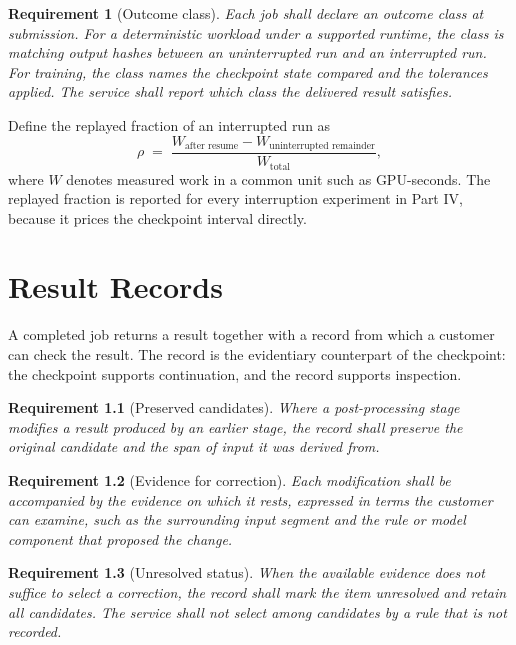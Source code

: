 \documentclass[11pt,openany]{book}
\newtheorem{requirement}{Requirement}[chapter]
\theoremstyle{remark}
\begin{document}
\begin{requirement}[Outcome class]
Each job shall declare an outcome class at submission. For a deterministic workload under a supported runtime, the class is matching output hashes between an uninterrupted run and an interrupted run. For training, the class names the checkpoint state compared and the tolerances applied. The service shall report which class the delivered result satisfies.
\end{requirement}

Define the replayed fraction of an interrupted run as
\[
\rho \;=\; \frac{W_{\text{after resume}} - W_{\text{uninterrupted remainder}}}{W_{\text{total}}},
\]
where $W$ denotes measured work in a common unit such as GPU-seconds. The replayed fraction is reported for every interruption experiment in Part IV, because it prices the checkpoint interval directly.

\chapter{Result Records}

A completed job returns a result together with a record from which a customer can check the result. The record is the evidentiary counterpart of the checkpoint: the checkpoint supports continuation, and the record supports inspection.

\begin{requirement}[Preserved candidates]
Where a post-processing stage modifies a result produced by an earlier stage, the record shall preserve the original candidate and the span of input it was derived from.
\end{requirement}

\begin{requirement}[Evidence for correction]
Each modification shall be accompanied by the evidence on which it rests, expressed in terms the customer can examine, such as the surrounding input segment and the rule or model component that proposed the change.
\end{requirement}

\begin{requirement}[Unresolved status]
When the available evidence does not suffice to select a correction, the record shall mark the item unresolved and retain all candidates. The service shall not select among candidates by a rule that is not recorded.
\end{requirement}

\end{document}
